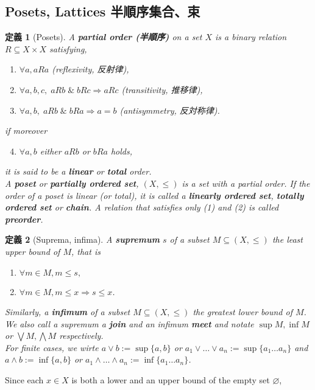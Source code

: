 \documentclass[a4j,12pt]{jarticle}
\numberwithin{equation}{section}
\newcommand{\itbf}[1]{\textit{\textbf{#1}}}
\newtheorem{dfn}{定義}[section]
\begin{document}
\subsection{Posets, Lattices 半順序集合、束}
\begin{dfn}[Posets]
  A \itbf{partial order (半順序)} on a set $X$ is a binary relation $R \subseteq X \times X$ satisfying,
  \begin{enumerate}
  \item $\forall a, aRa$ (reflexivity, 反射律),
  \item $\forall a,b,c,\; aRb \; \& \; bRc \Rightarrow aRc$ (transitivity, 推移律),
  \item $\forall a,b,\; aRb \; \& \; bRa \Rightarrow a=b$ (antisymmetry, 反対称律).
  \end{enumerate}
  if moreover
  \begin{enumerate}
    \setcounter{enumi}{3}
  \item $\forall a,b$ either $aRb$ or $bRa$ holds,
  \end{enumerate}
  it is said to be a \itbf{linear} or \itbf{total} order.\\
  A \itbf{poset} or \itbf{partially ordered set}, $(X, \le)$ is a set with a partial order.
  If the order of a poset is linear (or total), it is called a \itbf{linearly ordered set}, \itbf{totally ordered set} or \itbf{chain}.
  A relation that satisfies only (1) and (2) is called \itbf{preorder}.
\end{dfn}
\begin{dfn}[Suprema, infima]
  A \itbf{supremum} $s$ of a subset $M \subseteq (X, \le)$ the least upper bound of $M$, that is
  \begin{enumerate}
  \item $\forall m \in M, m \le s,$
  \item $\forall m \in M, m \le x \Rightarrow s \le x$.
  \end{enumerate}
  Similarly, a \itbf{infimum} of a subset $M \subseteq (X, \le)$ the greatest lower bound of $M$.\\
  We also call a supremum a \itbf{join} and an infimum \itbf{meet} and notate $\sup M, \inf M$ or $\bigvee M, \bigwedge M$ respectively.\\
  For finite cases, we wirte $a \vee b := \sup\{a,b\}$ or $a_1 \vee \dots \vee a_n := \sup\{a_1\dots a_n\}$ and $a \wedge b := \inf\{a,b\}$ or $a_1 \wedge \dots \wedge a_n := \inf\{a_1\dots a_n\}$.
\end{dfn}
Since each $x\in X$ is both a lower and an upper bound of the empty set $\varnothing$,
\end{document}
